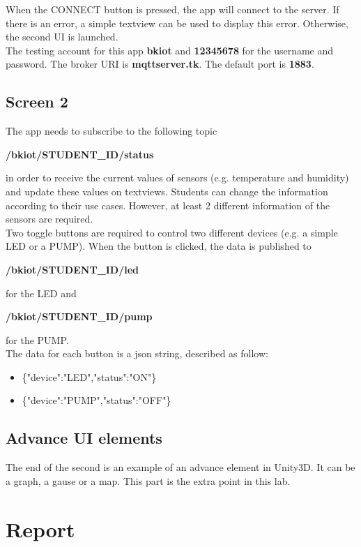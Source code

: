 \documentclass[a4paper,11pt]{article}
\theoremstyle{mytheor}
\begin{document}
When the CONNECT button is pressed, the app will connect to the server. If there is an error, a simple textview can be used to display this error. Otherwise, the second UI is launched.\\

The testing account for this app \textbf{bkiot} and \textbf{12345678} for the username and password. The broker URI is \textbf{mqttserver.tk}. The default port is \textbf{1883}.

\subsection{Screen 2}
The app needs to subscribe to the following topic
\begin{center}
    \textbf{/bkiot/STUDENT\_ID/status}
\end{center}
in order to receive the current values of sensors (e.g. temperature and humidity) and update
these values on textviews. Students can change the information according to their use cases.
However, at least 2 different information of the sensors are required.\\

Two toggle buttons are required to control two different devices (e.g. a simple LED or a
PUMP). When the button is clicked, the data is published to
\begin{center}
    \textbf{/bkiot/STUDENT\_ID/led}
\end{center}
for the LED and
\begin{center}
    \textbf{/bkiot/STUDENT\_ID/pump}
\end{center}
for the PUMP.\\

The data for each button is a json string, described as follow:
\begin{itemize}
    \item {\{"device":"LED","status":"ON"\}}
    \item {\{"device":"PUMP","status":"OFF"\}}
\end{itemize}

\subsection{Advance UI elements}
The end of the second is an example of an advance element in Unity3D. It can be a graph, a
gause or a map. This part is the extra point in this lab.

\section{Report}
\end{document}
